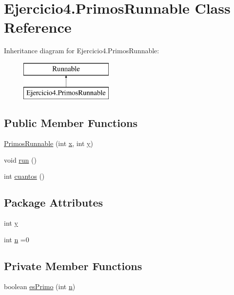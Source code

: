 \hypertarget{class_ejercicio4_1_1_primos_runnable}{}\section{Ejercicio4.\+Primos\+Runnable Class Reference}
\label{class_ejercicio4_1_1_primos_runnable}
Inheritance diagram for Ejercicio4.\+Primos\+Runnable\+:\begin{figure}[H]
\begin{center}
\leavevmode
\includegraphics[height=2.000000cm]{class_ejercicio4_1_1_primos_runnable}
\end{center}
\end{figure}
\subsection*{Public Member Functions}
\begin{DoxyCompactItemize}
\item 
\mbox{\hyperlink{class_ejercicio4_1_1_primos_runnable_abfd36421668265d32914bd274deb0197}{Primos\+Runnable}} (int \mbox{\hyperlink{class_ejercicio4_1_1_primos_runnable_a6247d4ce772969a27b7c821a3c22f5c7}{x}}, int \mbox{\hyperlink{class_ejercicio4_1_1_primos_runnable_af8c0c9f26577ea851dfb80040571a4f3}{y}})
\item 
void \mbox{\hyperlink{class_ejercicio4_1_1_primos_runnable_a8ea90c000de70dc0f10084003cf6716f}{run}} ()
\item 
int \mbox{\hyperlink{class_ejercicio4_1_1_primos_runnable_a99b8b16e1ea146e1e0c3938c881851ee}{cuantos}} ()
\end{DoxyCompactItemize}
\subsection*{Package Attributes}
\begin{DoxyCompactItemize}
\item 
int \mbox{\hyperlink{class_ejercicio4_1_1_primos_runnable_af8c0c9f26577ea851dfb80040571a4f3}{y}}
\item 
int \mbox{\hyperlink{class_ejercicio4_1_1_primos_runnable_a891fd5a28f4e81d096573d60d73a27dc}{n}} =0
\end{DoxyCompactItemize}
\subsection*{Private Member Functions}
\begin{DoxyCompactItemize}
\item 
boolean \mbox{\hyperlink{class_ejercicio4_1_1_primos_runnable_a613d7d8583b20db4b1cd1c23f545aa56}{es\+Primo}} (int \mbox{\hyperlink{class_ejercicio4_1_1_primos_runnable_a891fd5a28f4e81d096573d60d73a27dc}{n}})
\end{DoxyCompactItemize}
